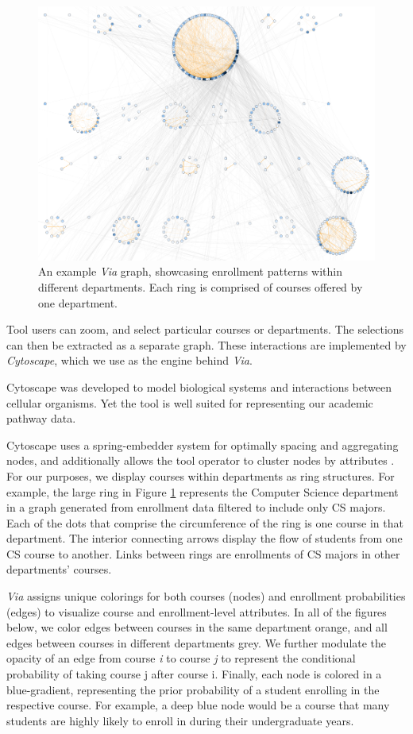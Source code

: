 \begin{figure}
    \centering
    \includegraphics[width=\columnwidth]{Figs/final-overview.pdf}
    \caption{An example {\em Via} graph, showcasing enrollment
      patterns within different departments. Each ring is comprised of
      courses offered by one department.}
    \label{fig:overview}
\end{figure}

Tool users can zoom, and select particular courses or
departments. The selections can then be extracted as a separate
graph. These interactions are implemented by \textit{Cytoscape}, which
we use as the engine behind {\em Via}.

Cytoscape was developed to model biological systems and interactions
between cellular organisms. Yet the tool is well suited for
representing our academic pathway data.

Cytoscape uses a spring-embedder system for optimally spacing and
aggregating nodes, and additionally allows the tool operator to
cluster nodes by attributes \cite{Battista1994}. For our purposes, we
display courses within departments as ring structures. For example,
the large ring in Figure \ref{fig:overview} represents the Computer
Science department in a graph generated from enrollment data filtered
to include only CS majors. Each of the dots that comprise the
circumference of the ring is one course in that department. The
interior connecting arrows display the flow of students from one CS
course to another. Links between rings are enrollments of CS majors in
other departments' courses.

{\em Via} assigns unique colorings for both courses (nodes) and
enrollment probabilities (edges) to visualize course and
enrollment-level attributes. In all of the figures below, we color
edges between courses in the same department orange, and all edges
between courses in different departments grey. We further modulate the
opacity of an edge from course \textit{i} to course \textit{j} to
represent the conditional probability of taking course j after course
i. Finally, each node is colored in a blue-gradient, representing the
prior probability of a student enrolling in the respective course. For
example, a deep blue node would be a course that many students are
highly likely to enroll in during their undergraduate years.

